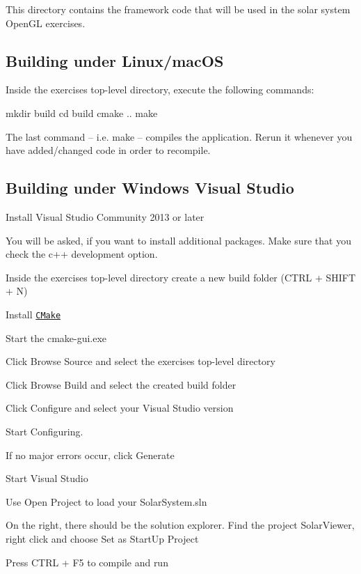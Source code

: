 This directory contains the framework code that will be used in the solar system Open\+GL exercises.

\subsection*{Building under Linux/mac\+OS }

Inside the exercise\textquotesingle{}s top-\/level directory, execute the following commands\+: \begin{DoxyVerb}mkdir build
cd build
cmake ..
make
\end{DoxyVerb}


The last command -- i.\+e. {\ttfamily make} -- compiles the application. Rerun it whenever you have added/changed code in order to recompile.

\subsection*{Building under Windows Visual Studio }


\begin{DoxyItemize}
\item Install Visual Studio Community 2013 or later
\item You will be asked, if you want to install additional packages. Make sure that you check the c++ development option.
\item Inside the exercise\textquotesingle{}s top-\/level directory create a new {\ttfamily build} folder (C\+T\+RL + S\+H\+I\+FT + N)
\item Install \href{https://cmake.org/download/}{\tt C\+Make}
\item Start the cmake-\/gui.\+exe
\item Click {\ttfamily Browse Source} and select the exercise\textquotesingle{}s top-\/level directory
\item Click {\ttfamily Browse Build} and select the created {\ttfamily build} folder
\item Click {\ttfamily Configure} and select your Visual Studio version
\item Start Configuring.
\item If no major errors occur, click {\ttfamily Generate}
\item Start Visual Studio
\item Use {\ttfamily Open Project} to load your {\ttfamily Solar\+System.\+sln}
\item On the right, there should be the solution explorer. Find the project {\ttfamily Solar\+Viewer}, right click and choose {\ttfamily Set as Start\+Up Project}
\item Press C\+T\+RL + F5 to compile and run
\end{DoxyItemize}

